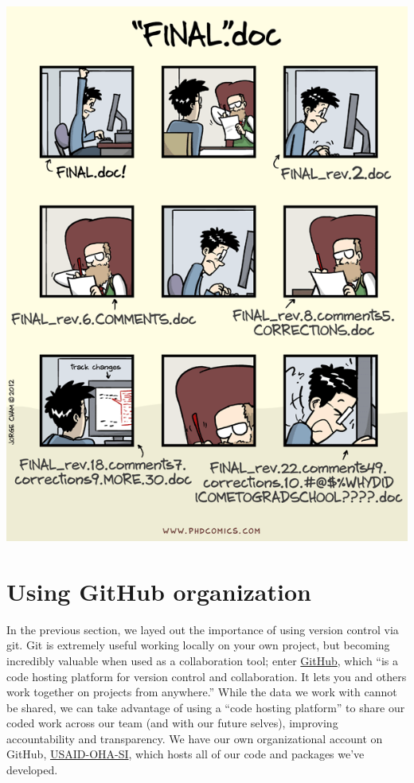 \documentclass[
  letterpaper,
  DIV=11,
  numbers=noendperiod]{scrreprt}
\begin{document}
\includegraphics{./images/image36 - version_control - final doc.png}

\hypertarget{using-github-organization}{%
\chapter{Using GitHub organization}\label{using-github-organization}}

In the previous section, we layed out the importance of using version
control via git. Git is extremely useful working locally on your own
project, but becoming incredibly valuable when used as a collaboration
tool; enter
\href{https://docs.github.com/en/get-started/quickstart/hello-world}{GitHub},
which ``is a code hosting platform for version control and
collaboration. It lets you and others work together on projects from
anywhere.'' While the data we work with cannot be shared, we can take
advantage of using a ``code hosting platform'' to share our coded work
across our team (and with our future selves), improving accountability
and transparency. We have our own organizational account on GitHub,
\href{https://github.com/USAID-OHA-SI}{USAID-OHA-SI}, which hosts all of
our code and packages we've developed.
\end{document}

